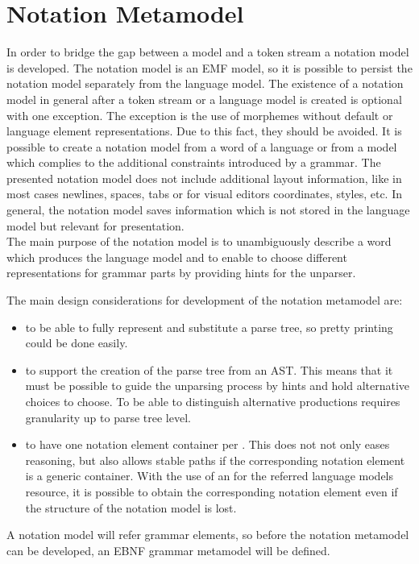 \section{Notation Metamodel} \label{chp:NotMM}
In order to bridge the gap between a model and a token stream a notation model is developed. The notation model is an EMF model, so it is possible to persist the notation model separately from the language model. The existence of a notation model in general after a token stream or a language model is created is optional with one exception. The exception is the use of morphemes without default or language element representations. Due to this fact, they should be avoided. It is possible to create a notation model from a word of a language or from a model which complies to the additional constraints introduced by a grammar. The presented notation model does not include additional layout information, like in most cases newlines, spaces, tabs or for visual editors coordinates, styles, etc. In general, the notation model saves information which is not stored in the language model but relevant for presentation.\\

The main purpose of the notation model is to unambiguously describe a word which produces the language model and to enable to choose different representations for grammar parts by providing hints for the unparser.

The main design considerations for development of the notation metamodel are:
\begin{itemize}
	\item to be able to fully represent and substitute a parse tree, so pretty printing could be done easily.
	\item to support the creation of the parse tree from an AST. This means that it must be possible to guide the unparsing process by hints and hold alternative choices to choose. To be able to distinguish alternative productions requires granularity up to parse tree level.
	\item to have one notation element container per . This does not not only eases reasoning, but also allows stable paths if the corresponding notation element is a generic container. With the use of an  for the referred language models resource, it is possible to obtain the corresponding notation element even if the structure of the notation model is lost. 
\end{itemize}

A notation model will refer grammar elements, so before the notation metamodel can be developed, an EBNF grammar metamodel will be defined. \\

